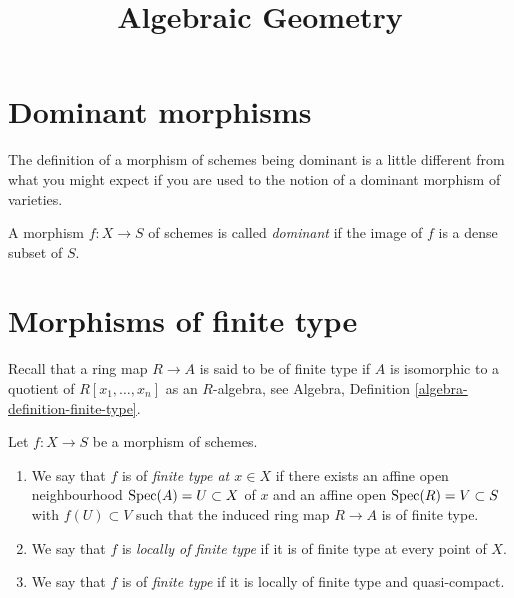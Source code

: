 



\title{Algebraic Geometry}
\maketitle

\label{section-phantom}

\tableofcontents

\section{Dominant morphisms}
\label{section-dominant}

\noindent
The definition of a morphism of schemes being dominant is a little
different from what you might expect if you are used to the notion
of a dominant morphism of varieties.

\begin{definition}
\label{definition-dominant}
A morphism $f : X \to S$ of schemes is called {\it dominant} if the
image of $f$ is a dense subset of $S$.
\end{definition}

\section{Morphisms of finite type}
\label{section-finite-type}

\noindent
Recall that a ring map $R \to A$ is said to be of finite type if
$A$ is isomorphic to a quotient of $R[x_1, \ldots, x_n]$ as an $R$-algebra, see
Algebra, Definition \ref{algebra-definition-finite-type}.

\begin{definition}
\label{definition-finite-type}
Let $f : X \to S$ be a morphism of schemes.
\begin{enumerate}
\item We say that $f$ is of {\it finite type at $x \in X$} if
there exists an affine open neighbourhood $\mathop{\mathrm{Spec}}(A) = U \subset X$
of $x$ and an affine open $\mathop{\mathrm{Spec}}(R) = V \subset S$
with $f(U) \subset V$ such that the induced ring map
$R \to A$ is of finite type.
\item We say that $f$ is {\it locally of finite type} if it is
of finite type at every point of $X$.
\item We say that $f$ is of {\it finite type} if it is locally of
finite type and quasi-compact.
\end{enumerate}
\end{definition}

